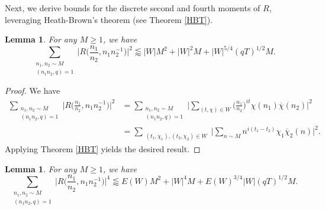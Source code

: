 \documentclass[12pt]{amsart}
\newtheorem{lemma}[theorem]{Lemma}
\theoremstyle{definition}
\theoremstyle{plain}
\theoremstyle{remark}
\numberwithin{equation}{section}
\numberwithin{theorem}{section}
\numberwithin{equation}{section}
\begin{document}
	Next, we derive bounds for the discrete second and fourth moments of $R$, leveraging Heath-Brown's theorem (see Theorem \ref{HBT}).
	\begin{lemma}\label{secmR}
		For any $M \geq 1$, we have 
		\[ \sum_{\substack{n_1,n_2 \sim M  \\  (n_1n_2, q)=1}}\bigg|R\bigg(\frac{n_{1}}{n_{2}}, n_{1}n_{2}^{-1}\bigg)\bigg|^{2} \lessapprox |W|M^{2}+ |W|^{2}M+ |W|^{5/4}(qT)^{1/2}M.\]
	\end{lemma}
	\begin{proof}
		We have 
		\begin{align*}
			\sum_{\substack{n_1,n_2 \sim M \\ (n_1n_2, q)=1}}\bigg|R\bigg(\frac{n_{1}}{n_{2}}, n_{1}n_{2}^{-1}\bigg)\bigg|^{2}&=\sum_{\substack{n_1,n_2 \sim M \\ (n_1n_2, q)=1}}\bigg| \sum_{(t, \chi) \in W}\bigg(\frac{n_{1}}{n_{2}}\bigg)^{it}\chi(n_{1})\overline{\chi}(n_{2})\bigg|^{2}
			\\
			&=\sum_{\substack{(t_1,\chi_1),(t_2,\chi_2)\in W}}\bigg| \sum_{n\sim M}n^{i(t_{1}-t_{2})}\chi_{1}\overline{\chi}_{2}(n)\bigg|^{2}.
		\end{align*}
		Applying Theorem \ref{HBT} yields the desired result. 
	\end{proof}
	\begin{lemma}\label{fourmR}
		For any $M\geq 1$, we have 
		\[ \sum_{\substack{n_1,n_2 \sim M \\ (n_1n_2, q)=1}}\bigg|R\bigg(\frac{n_{1}}{n_{2}}, n_{1}n_{2}^{-1}\bigg)\bigg|^{4} \lessapprox E(W)M^{2}+ |W|^{4}M+ E(W)^{3/4}|W|(qT)^{1/2}M.\]
	\end{lemma}
\end{document}
